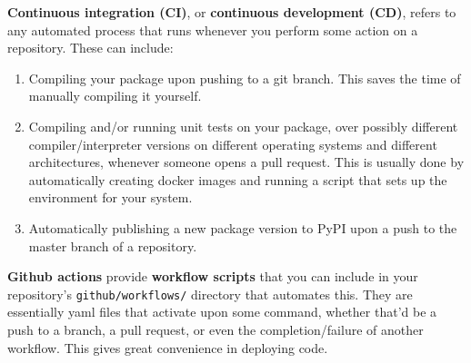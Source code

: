 \documentclass{article}
\begin{document}
  \textbf{Continuous integration (CI)}, or \textbf{continuous development (CD)}, refers to any automated process that runs whenever you perform some action on a repository. These can include: 
  \begin{enumerate}
    \item Compiling your package upon pushing to a git branch. This saves the time of manually compiling it yourself. 
    \item Compiling and/or running unit tests on your package, over possibly different compiler/interpreter versions on different operating systems and different architectures, whenever someone opens a pull request. This is usually done by automatically creating docker images and running a script that sets up the environment for your system. 
    \item Automatically publishing a new package version to PyPI upon a push to the master branch of a repository. 
  \end{enumerate} 

  \textbf{Github actions} provide \textbf{workflow scripts} that you can include in your repository's \texttt{github/workflows/} directory that automates this. They are essentially yaml files that activate upon some command, whether that'd be a push to a branch, a pull request, or even the completion/failure of another workflow. This gives great convenience in deploying code. 

  

\section{}
\end{document}
